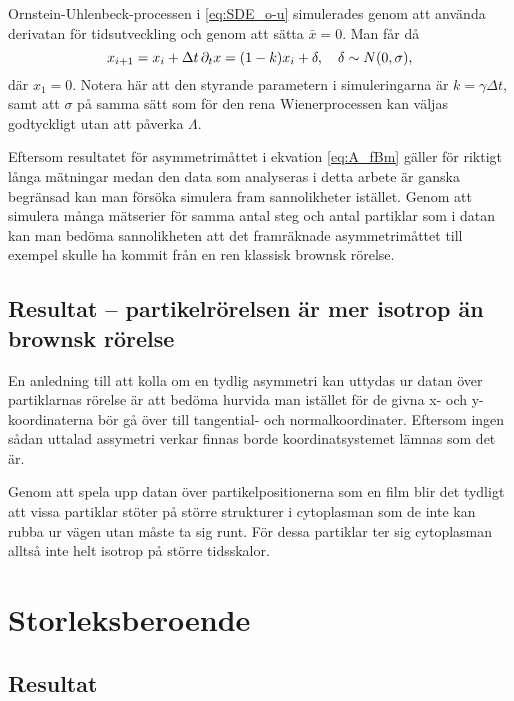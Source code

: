 Ornstein-Uhlenbeck-processen i \eqref{eq:SDE_o-u} simulerades genom att använda derivatan för tidsutveckling och genom att sätta $\bar{x}=0$. Man får då
\begin{equation}
x_{i+1} = x_i + \Delta{t}\,\pd_{t}x  = (1-k) x_i +  \delta 
\qcomma  \delta \sim N(0, \sigma),
\end{equation}
där $x_1=0$. Notera här att den styrande parametern i simuleringarna är $k=\gamma\Delta{t}$, samt att $\sigma$ på samma sätt som för den rena Wienerprocessen kan väljas godtyckligt utan att påverka $\varLambda$. 

Eftersom resultatet för asymmetrimåttet i ekvation \eqref{eq:A_fBm} gäller för riktigt långa mätningar medan den data som analyseras i detta arbete är ganska begränsad kan man försöka simulera fram sannolikheter istället. Genom att simulera många mätserier för samma antal steg och antal partiklar som i datan kan man bedöma sannolikheten att det framräknade asymmetrimåttet till exempel skulle ha kommit från en ren klassisk brownsk rörelse. 

\subsection{Resultat -- partikelrörelsen är mer isotrop än brownsk rörelse}
En anledning till att kolla om en tydlig asymmetri kan uttydas ur datan över partiklarnas rörelse är att bedöma hurvida man istället för de givna x- och y-koordinaterna bör gå över till tangential- och normalkoordinater. Eftersom ingen sådan uttalad assymetri verkar finnas borde koordinatsystemet lämnas som det är.

Genom att spela upp datan över partikelpositionerna som en film blir det tydligt att vissa partiklar stöter på större strukturer i cytoplasman som de inte kan rubba ur vägen utan måste ta sig runt. För dessa partiklar ter sig cytoplasman alltså inte helt isotrop på större tidsskalor. 




\section{Storleksberoende}


\subsection{Resultat}


